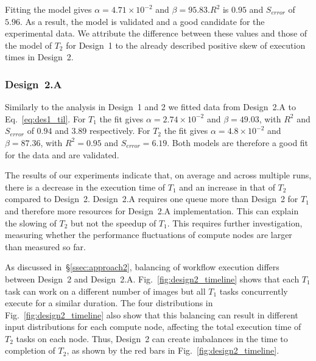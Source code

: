 Fitting the model gives $\alpha = 4.71 \times 10^{-2}$ and 
$\beta = 95.83$.$R^{2}$ is $0.95$ and $S_{error}$ of $5.96$. As a result, the 
model is validated and a good candidate for the experimental data. We 
attribute the difference between these values and those of the model of 
$T_{2}$ for Design~1 to the already described positive skew of execution times 
in Design~2.

\subsubsection{Design~2.A} Similarly to the analysis in Design~1 and 2 we fitted data from Design~2.A to Eq.~\ref{eq:des1_til}.
For $T_{1}$ the fit gives $\alpha=2.74\times10^{-2}$ and $\beta=49.03$, with 
$R^{2}$ and $S_{error}$ of $0.94$ and $3.89$ respectively. For $T_{2}$ the fit 
gives $\alpha=4.8\times10^{-2}$ and $\beta=87.36$, with $R^{2}=0.95$ and 
$S_{error}=6.19$. Both models are therefore a good fit for the data and are 
validated.

The results of our experiments indicate that, on average and across multiple 
runs, there is a decrease in the execution time of $T_{1}$ and an increase in 
that of $T_{2}$ compared to Design~2. Design~2.A requires one queue more than 
Design~2 for $T_{1}$ and therefore more resources for Design~2.A 
implementation. This can explain the slowing of $T_{2}$ but not the speedup of 
$T_{1}$. This requires further investigation, measuring whether the 
performance fluctuations of compute nodes are larger than measured so far.

As discussed in~\S\ref{ssec:approach2}, balancing of workflow execution 
differs between Design~2 and Design~2.A. Fig.~\ref{fig:design2_timeline} shows 
that each $T_{1}$ task can work on a different number of images but all 
$T_{1}$ tasks concurrently execute for a similar duration. The four 
distributions in Fig.~\ref{fig:design2_timeline} also show that this balancing 
can result in different input distributions for each compute node, affecting 
the total execution time of $T_{2}$ tasks on each node. Thus, Design~2 can 
create imbalances in the time to completion of $T_{2}$, as shown by the red 
bars in Fig.~\ref{fig:design2_timeline}.

